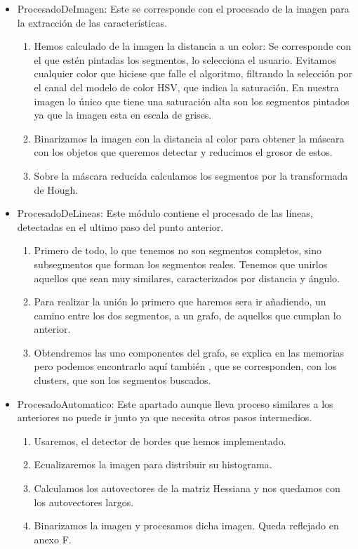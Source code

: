 \begin{itemize}
\item ProcesadoDeImagen: Este se corresponde con el procesado de la imagen para la extracción de las características.
	\begin{enumerate}

	\item Hemos calculado de la imagen la distancia a un color: Se corresponde con el que estén pintadas los segmentos, lo selecciona el usuario. Evitamos cualquier color que hiciese que falle el algoritmo, filtrando la selección por el canal del modelo de color HSV, que indica la saturación. En nuestra imagen lo único que tiene una saturación alta son los segmentos pintados ya que la imagen esta en escala de grises.

	\item Binarizamos la imagen con la distancia al color para obtener la máscara con los objetos que queremos detectar y reducimos el grosor de estos.

	\item Sobre la máscara reducida calculamos los segmentos por la transformada de Hough.
	\end{enumerate}

\item ProcesadoDeLineas: Este módulo contiene el procesado de las lineas, detectadas en el ultimo paso del punto anterior.
\begin{enumerate}

\item Primero de todo, lo que tenemos no son segmentos completos, sino subsegmentos que forman los segmentos reales. Tenemos que unirlos aquellos que sean muy similares, caracterizados por distancia y ángulo.

\item Para realizar la unión lo primero que haremos sera ir añadiendo, un camino entre los dos segmentos, a un grafo, de aquellos que cumplan lo anterior.

\item Obtendremos las uno componentes del grafo, se explica en las memorias pero podemos encontrarlo aquí también \cite{Wiki:Grafos}, que se corresponden, con los clusters, que son los segmentos buscados.
\end{enumerate}

\item ProcesadoAutomatico: Este apartado aunque lleva proceso similares a los anteriores no puede ir junto ya que necesita otros pasos intermedios.
\begin{enumerate}

\item Usaremos, el detector de bordes que hemos implementado.
\item Ecualizaremos la imagen para distribuir su histograma.
\item Calculamos los autovectores de la matriz Hessiana y nos quedamos con los autovectores largos.
\item Binarizamos la imagen y procesamos dicha imagen. Queda reflejado en anexo F.
\end{enumerate}

\end{itemize}

